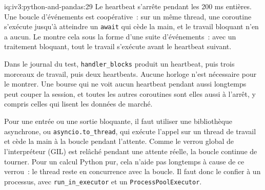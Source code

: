 \begin{solution}{iq:iv3:python-and-pandas:29}
Le heartbeat s'arrête pendant les 200 ms entières. Une boucle d'événements est coopérative~: sur un même thread, une coroutine s'exécute jusqu'à atteindre un \texttt{await} qui cède la main, et le travail bloquant n'en a aucun. Le  montre cela sous la forme d'une suite d'événements~: avec un traitement bloquant, tout le travail s'exécute avant le heartbeat suivant.
\label{lst:iv3:pp:async}

Dans le journal du test, \texttt{handler\_blocks} produit un heartbeat, puis trois morceaux de travail, puis deux heartbeats. Aucune horloge n'est nécessaire pour le montrer. Une bourse qui ne voit aucun heartbeat pendant aussi longtemps peut couper la session, et toutes les autres coroutines sont elles aussi à l'arrêt, y compris celles qui lisent les données de marché.

Pour une entrée ou une sortie bloquante, il faut utiliser une bibliothèque asynchrone, ou \texttt{asyncio.to\_thread}, qui exécute l'appel sur un thread de travail et cède la main à la boucle pendant l'attente. Comme le verrou global de l'interpréteur (GIL) est relâché pendant une attente réelle, la boucle continue de tourner. Pour un calcul Python pur, cela n'aide pas longtemps à cause de ce verrou~: le thread reste en concurrence avec la boucle. Il faut donc le confier à un processus, avec \texttt{run\_in\_executor} et un \texttt{ProcessPoolExecutor}.

\end{solution}

